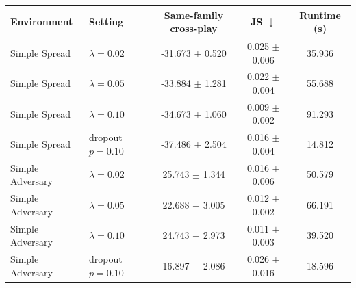 \begin{tabular}{llccc}
\toprule
Environment & Setting & Same-family cross-play & JS $\downarrow$ & Runtime (s) \\
\midrule
Simple Spread & $\lambda=0.02$ & -31.673 $\pm$ 0.520 & 0.025 $\pm$ 0.006 & 35.936 \\
Simple Spread & $\lambda=0.05$ & -33.884 $\pm$ 1.281 & 0.022 $\pm$ 0.004 & 55.688 \\
Simple Spread & $\lambda=0.10$ & -34.673 $\pm$ 1.060 & 0.009 $\pm$ 0.002 & 91.293 \\
Simple Spread & dropout $p=0.10$ & -37.486 $\pm$ 2.504 & 0.016 $\pm$ 0.004 & 14.812 \\
\midrule
Simple Adversary & $\lambda=0.02$ & 25.743 $\pm$ 1.344 & 0.016 $\pm$ 0.006 & 50.579 \\
Simple Adversary & $\lambda=0.05$ & 22.688 $\pm$ 3.005 & 0.012 $\pm$ 0.002 & 66.191 \\
Simple Adversary & $\lambda=0.10$ & 24.743 $\pm$ 2.973 & 0.011 $\pm$ 0.003 & 39.520 \\
Simple Adversary & dropout $p=0.10$ & 16.897 $\pm$ 2.086 & 0.026 $\pm$ 0.016 & 18.596 \\
\bottomrule
\end{tabular}
